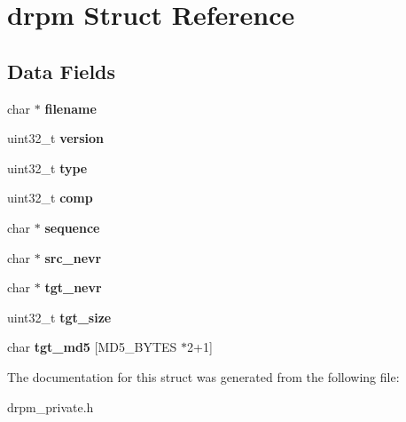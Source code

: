 \hypertarget{structdrpm}{\section{drpm Struct Reference}
\label{structdrpm}
}
\subsection*{Data Fields}
\begin{DoxyCompactItemize}
\item 
\hypertarget{structdrpm_afcee683c1ba6abf53b308dabd982d4c4}{char $\ast$ {\bfseries filename}}\label{structdrpm_afcee683c1ba6abf53b308dabd982d4c4}

\item 
\hypertarget{structdrpm_a53967999e90cce50a9e02dd85b1de519}{uint32\-\_\-t {\bfseries version}}\label{structdrpm_a53967999e90cce50a9e02dd85b1de519}

\item 
\hypertarget{structdrpm_af8fab40b4d43d8724b937e9ce4179b46}{uint32\-\_\-t {\bfseries type}}\label{structdrpm_af8fab40b4d43d8724b937e9ce4179b46}

\item 
\hypertarget{structdrpm_a1e52b0820edc3cb5154bec18f8161b01}{uint32\-\_\-t {\bfseries comp}}\label{structdrpm_a1e52b0820edc3cb5154bec18f8161b01}

\item 
\hypertarget{structdrpm_accd6291e0215834bef34ea4ff8a92adf}{char $\ast$ {\bfseries sequence}}\label{structdrpm_accd6291e0215834bef34ea4ff8a92adf}

\item 
\hypertarget{structdrpm_a41f16db87541f575567c06cef3884fd4}{char $\ast$ {\bfseries src\-\_\-nevr}}\label{structdrpm_a41f16db87541f575567c06cef3884fd4}

\item 
\hypertarget{structdrpm_a370708789000293de387e15f94821021}{char $\ast$ {\bfseries tgt\-\_\-nevr}}\label{structdrpm_a370708789000293de387e15f94821021}

\item 
\hypertarget{structdrpm_adae0f59a20d5fec787b11d8186e5dd02}{uint32\-\_\-t {\bfseries tgt\-\_\-size}}\label{structdrpm_adae0f59a20d5fec787b11d8186e5dd02}

\item 
\hypertarget{structdrpm_a30038ca767dd84d8e9380ebcce1612a8}{char {\bfseries tgt\-\_\-md5} \mbox{[}M\-D5\-\_\-\-B\-Y\-T\-E\-S $\ast$2+1\mbox{]}}\label{structdrpm_a30038ca767dd84d8e9380ebcce1612a8}

\end{DoxyCompactItemize}


The documentation for this struct was generated from the following file\-:\begin{DoxyCompactItemize}
\item 
drpm\-\_\-private.\-h\end{DoxyCompactItemize}
